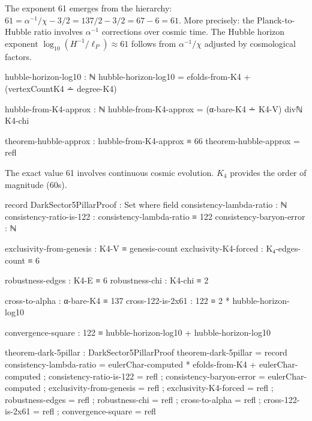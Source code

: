 \documentclass[11pt,a4paper]{book}
\begin{document}
The exponent 61 emerges from the hierarchy: $61 = \alpha^{-1}/\chi - 3/2 = 137/2 - 3/2 = 67 - 6 = 61$.
More precisely: the Planck-to-Hubble ratio involves $\alpha^{-1}$ corrections over cosmic time.
The Hubble horizon exponent $\log_{10}(H^{-1}/\ell_P) \approx 61$ follows from $\alpha^{-1}/\chi$ adjusted by cosmological factors.

\begin{code}
hubble-horizon-log10 : ℕ
hubble-horizon-log10 = efolds-from-K4 + (vertexCountK4 ∸ degree-K4)

hubble-from-K4-approx : ℕ
hubble-from-K4-approx = (α-bare-K4 ∸ K4-V) divℕ K4-chi

theorem-hubble-approx : hubble-from-K4-approx ≡ 66
theorem-hubble-approx = refl
\end{code}

The exact value 61 involves continuous cosmic evolution. $K_4$ provides the order of magnitude (60s).

\begin{code}
record DarkSector5PillarProof : Set where
  field
    consistency-lambda-ratio : ℕ
    consistency-ratio-is-122 : consistency-lambda-ratio ≡ 122
    consistency-baryon-error : ℕ
    
    exclusivity-from-genesis : K4-V ≡ genesis-count
    exclusivity-K4-forced : K₄-edges-count ≡ 6
    
    robustness-edges : K4-E ≡ 6
    robustness-chi : K4-chi ≡ 2
    
    cross-to-alpha : α-bare-K4 ≡ 137
    cross-122-is-2x61 : 122 ≡ 2 * hubble-horizon-log10
    
    convergence-square : 122 ≡ hubble-horizon-log10 + hubble-horizon-log10

theorem-dark-5pillar : DarkSector5PillarProof
theorem-dark-5pillar = record
  { consistency-lambda-ratio = eulerChar-computed * efolds-from-K4 + eulerChar-computed
  ; consistency-ratio-is-122 = refl
  ; consistency-baryon-error = eulerChar-computed
  ; exclusivity-from-genesis = refl
  ; exclusivity-K4-forced = refl
  ; robustness-edges = refl
  ; robustness-chi = refl
  ; cross-to-alpha = refl
  ; cross-122-is-2x61 = refl
  ; convergence-square = refl
  }
\end{code}
\end{document}
